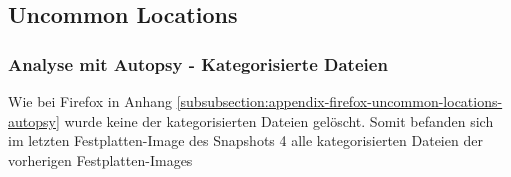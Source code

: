 \begin{appendices}


\subsection{Uncommon Locations}
\label{subsection:appendix-tor-uncommon-locations}

\subsubsection*{Analyse mit Autopsy - Kategorisierte Dateien}
\label{subsubsection:appendix-tor-uncommon-locations-autopsy}

Wie bei Firefox in Anhang \ref{subsubsection:appendix-firefox-uncommon-locations-autopsy} wurde keine der kategorisierten Dateien gelöscht. Somit befanden sich im letzten Festplatten-Image des Snapshots 4 alle kategorisierten Dateien der vorherigen Festplatten-Images


\end{appendices}
